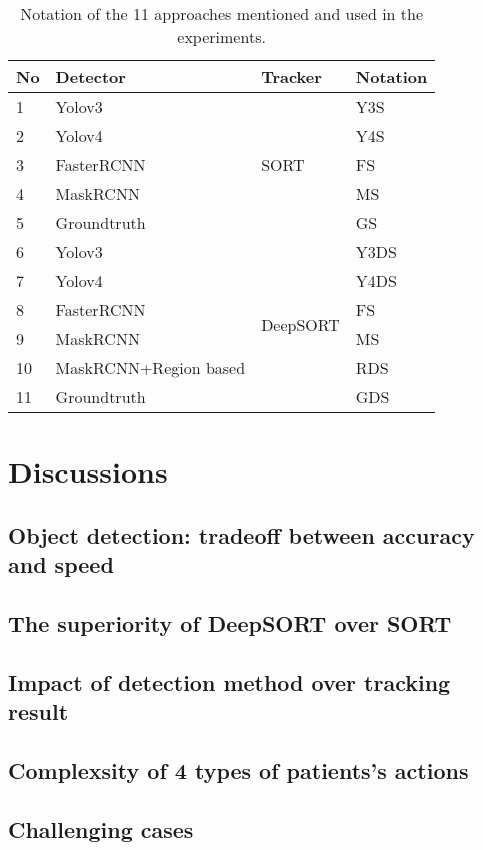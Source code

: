 \begin{table}[]
	\label{tab:notation}
	\begin{tabular}{|l|l|l|l|}
		\hline
		No & Detector              & Tracker                                        & Notation \\ \hline
		1  & Yolov3                & \multirow{5}{*}{SORT}                          & Y3S      \\ \cline{1-2} \cline{4-4} 
		2  & Yolov4                &                                                & Y4S      \\ \cline{1-2} \cline{4-4} 
		3  & FasterRCNN            &                                                & FS       \\ \cline{1-2} \cline{4-4} 
		4  & MaskRCNN              &                                                & MS       \\ \cline{1-2} \cline{4-4} 
		5  & Groundtruth           &                                                & GS       \\ \hline
		6  & Yolov3                & \multicolumn{1}{c|}{\multirow{6}{*}{DeepSORT}} & Y3DS     \\ \cline{1-2} \cline{4-4} 
		7  & Yolov4                & \multicolumn{1}{c|}{}                          & Y4DS     \\ \cline{1-2} \cline{4-4} 
		8  & FasterRCNN            & \multicolumn{1}{c|}{}                          & FS       \\ \cline{1-2} \cline{4-4} 
		9  & MaskRCNN              & \multicolumn{1}{c|}{}                          & MS       \\ \cline{1-2} \cline{4-4} 
		10 & MaskRCNN+Region based & \multicolumn{1}{c|}{}                          & RDS      \\ \cline{1-2} \cline{4-4} 
		11 & Groundtruth           & \multicolumn{1}{c|}{}                          & GDS      \\ \hline
	\end{tabular}
	\caption{Notation of the 11 approaches mentioned and used in the experiments.}
\end{table}
\section{Discussions}
\subsection{Object detection: tradeoff between accuracy and speed}
\subsection{The superiority of DeepSORT over SORT}
\subsection{Impact of detection method over tracking result}
\subsection{Complexsity of 4 types of patients's actions}
\subsection{Challenging cases}